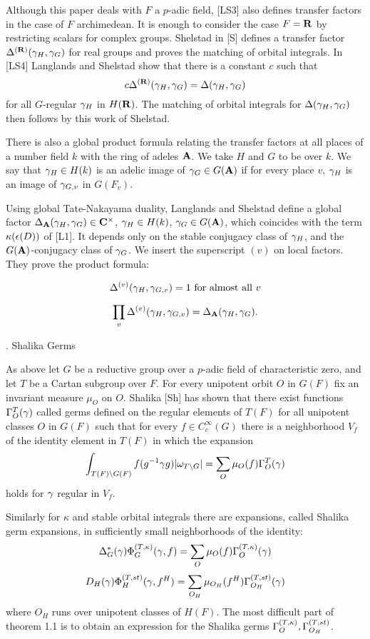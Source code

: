 \bigskip
Although this paper deals with $F$ a $p$-adic field, [LS3] also
defines transfer factors in the case of $F$ archimedean.  It is
enough to consider the case $F=\RR$ by restricting scalars for
complex groups.   Shelstad in [S] defines a transfer factor
$\Delta^{(\RR)}(\c_H,\c_G)$ for real groups and proves the
matching of orbital integrals.  In [LS4] Langlands and Shelstad
show that there is a constant $c$ such that $$c\Delta^{(\RR)}(\c_H,\c_G)=
\Delta(\c_H,\c_G)$$ for all $G$-regular $\c_H$ in $H(\RR)$.  The
matching of orbital integrals for $\Delta(\c_H,\c_G)$ then follows
by this work of Shelstad.

There is also a global product formula relating the transfer
factors at all places of a number field $k$ with the ring of
adeles $\AA$.  We take $H$ and $G$ to be over $k$.  We say that
$\c_H \in H(k)$ is an adelic image of $\c_G\in G(\AA)$ if for
every place $v$, $\c_H$ is an image of $\c_{G,v}$ in $G(F_v)$.

Using global Tate-Nakayama duality, Langlands and Shelstad 
define a global factor $\Delta_\AA(\c_H,\c_G)\in \CC^\times$,
$\c_H\in H(k)$, $\c_G\in G(\AA)$, which coincides with the
term $\k(\ep(D))$ of [L1].  It depends only on the stable
conjugacy class of $\c_H$, and the $G(\AA)$-conjugacy class
of $\c_G$.   We insert the superscript $(v)$ on local factors.
They prove the product formula:

  $$\Delta^{(v)}(\c_H,\c_{G,v}) =1 \hbox{ for almost all } v$$

  $$\prod_v\Delta^{(v)}(\c_H,\c_{G,v})=\Delta_\AA(\c_H,\c_G).$$



.	Shalika Germs 
\endsect

As above let $G$ be a reductive group over a $p$-adic field of
characteristic zero, and let $T$ be a Cartan subgroup over $F$.
For every unipotent orbit $O$ in $G(F)$ fix an invariant measure $\mu_O$
on $O$.
Shalika [Sh] has shown that there
exist functions $\Gamma_O^T(\c)$ called germs defined on the regular
elements of $T(F)$ for all unipotent classes $O$ in $G(F)$ such that
for every $f \in C_c^\infty(G)$ there is a neighborhood $V_f$ of the
identity element in $T(F)$ in which the expansion
$$ \int_{T(F)\backslash G(F)} f(g\i\c g) |\omega_{T\backslash G}|
= \sum_O
\mu_O(f)\Gamma_O^T(\c)$$
holds for $\c$ regular in $V_f$.

Similarly for $\kappa$ and stable orbital integrals there are
expansions, called Shalika germ expansions,
 in sufficiently small neighborhoods of the identity:
$$ \Delta^*_G(\c) \KOI \c f = \sum_O \mu_O(f) \Gamma_O^{(T,\k)}(\c)$$ 
$$ D_H(\c) \SOI \c {f^H} = \sum_{O_H} \mu_{O_H}(f^H)
\Gamma_{O_H}^{(T,st)}(\c)$$
where $O_H$ runs over unipotent classes of $H(F)$.  The most difficult
part of theorem 1.1 is to obtain an expression for the Shalika germs
$\C_O^{(T,\k)},\C_{O_H}^{(T,st)}$.

